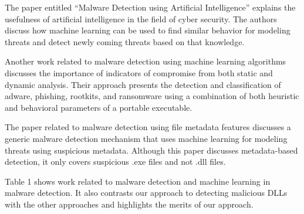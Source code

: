 \documentclass{article}
\begin{document}
The paper entitled “Malware Detection using Artificial Intelligence”\cite{ai_malware_detection} explains the usefulness of artificial intelligence in the field of cyber security. The authors discuss how machine learning can be used to find similar behavior for modeling threats and detect newly coming threats based on that knowledge.

Another work related to malware detection\cite{ml_malware_detection} using machine learning algorithms discusses the importance of indicators of compromise from both static and dynamic analysis. Their approach presents the detection and classification of adware, phishing, rootkits, and ransomware using a combination of both heuristic and behavioral parameters of a portable executable.

The paper related to malware detection using file metadata features\cite{metadata_malware_detection} discusses a generic malware detection mechanism that uses machine learning for modeling threats using suspicious metadata. Although this paper discusses metadata-based detection, it only covers suspicious .exe files and not .dll files.

Table 1 shows work related to malware detection and machine learning in malware detection. It also contrasts our approach to detecting malicious DLLs with the other approaches and highlights the merits of our approach.
\end{document}
